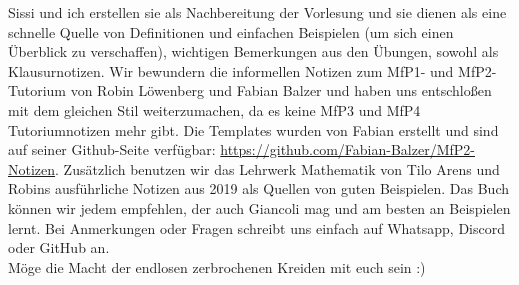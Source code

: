 Sissi und ich erstellen sie als Nachbereitung der Vorlesung und sie dienen als eine schnelle Quelle von Definitionen und einfachen Beispielen (um sich einen Überblick zu verschaffen), wichtigen Bemerkungen aus den Übungen, sowohl als Klausurnotizen. Wir bewundern die informellen Notizen zum MfP1- und MfP2-Tutorium von Robin Löwenberg und Fabian Balzer und haben uns entschloßen mit dem gleichen Stil weiterzumachen, da es keine MfP3 und MfP4 Tutoriumnotizen mehr gibt. Die Templates wurden von Fabian erstellt und sind auf seiner Github-Seite verfügbar:  \url{https://github.com/Fabian-Balzer/MfP2-Notizen}. Zusätzlich benutzen wir das Lehrwerk Mathematik von Tilo Arens und Robins ausführliche Notizen aus 2019 als Quellen von guten Beispielen. Das Buch können wir jedem empfehlen, der auch Giancoli mag und am besten an Beispielen lernt. Bei Anmerkungen oder Fragen schreibt uns einfach auf Whatsapp, Discord oder GitHub an. \\ 

Möge die Macht der endlosen zerbrochenen Kreiden mit euch sein :)

\cfoot{\pagemark}
